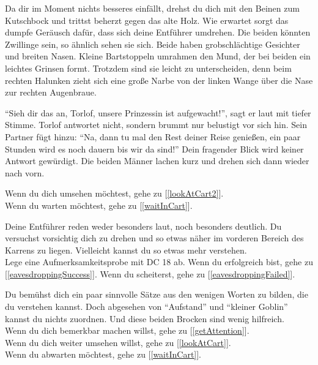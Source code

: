 Da dir im Moment nichts besseres einfällt, drehst du dich mit den Beinen zum Kutschbock und trittst beherzt gegen das alte Holz. Wie erwartet sorgt das dumpfe Geräusch dafür, dass sich deine Entführer umdrehen. Die beiden könnten Zwillinge sein, so ähnlich sehen sie sich. Beide haben grobschlächtige Gesichter und breiten Nasen. Kleine Bartstoppeln umrahmen den Mund, der bei beiden ein leichtes Grinsen formt. Trotzdem sind sie leicht zu unterscheiden, denn beim rechten Halunken zieht sich eine große Narbe von der linken Wange über die Nase zur rechten Augenbraue.

``Sieh dir das an, Torlof, unsere Prinzessin ist aufgewacht!'', sagt er laut mit tiefer Stimme. Torlof antwortet nicht, sondern brummt nur belustigt vor sich hin. Sein Partner fügt hinzu: ``Na, dann tu mal den Rest deiner Reise genießen, ein paar Stunden wird es noch dauern bis wir da sind!''
Dein fragender Blick wird keiner Antwort gewürdigt. Die beiden Männer lachen kurz und drehen sich dann wieder nach vorn.

Wenn du dich umsehen möchtest, gehe zu [\ref{lookAtCart2}].
\\Wenn du warten möchtest, gehe zu [\ref{waitInCart}].


Deine Entführer reden weder besonders laut, noch besonders deutlich. Du versuchst vorsichtig dich zu drehen und so etwas näher im vorderen Bereich des Karrens zu liegen. Vielleicht kannst du so etwas mehr verstehen.
\\Lege eine Aufmerksamkeitsprobe mit DC 18 ab. Wenn du erfolgreich bist, gehe zu [\ref{eavesdroppingSuccess}].
Wenn du scheiterst, gehe zu [\ref{eavesdroppingFailed}].


Du bemühst dich ein paar sinnvolle Sätze aus den wenigen Worten zu bilden, die du verstehen kannst. Doch abgesehen von ``Aufstand'' und ``kleiner Goblin'' kannst du nichts zuordnen. Und diese beiden Brocken sind wenig hilfreich.
\\Wenn du dich bemerkbar machen willst, gehe zu [\ref{getAttention}].
\\Wenn du dich weiter umsehen willst, gehe zu [\ref{lookAtCart}].
\\Wenn du abwarten möchtest, gehe zu [\ref{waitInCart}].


